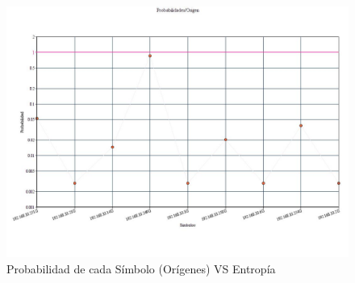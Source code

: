 \begin{figure}[H]
  \centering
    \includegraphics[scale=0.45]{imagenes/graficos/Probabilidades/06origen.jpg}
  \caption{Probabilidad de cada Símbolo (Orígenes) VS Entropía }
  \label{fig:18}
\end{figure}